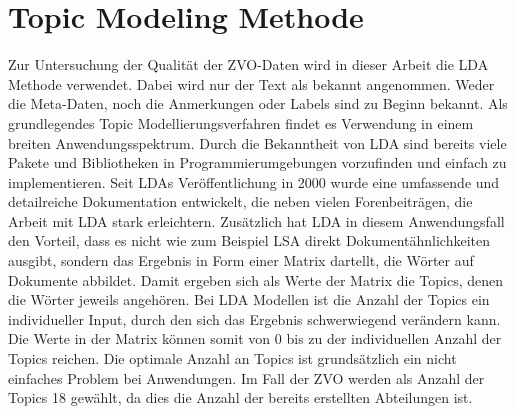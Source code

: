 \documentclass[german,version-2020-11]{uzl-thesis}
\begin{document}
\section{Topic Modeling Methode}
Zur Untersuchung der Qualität der ZVO-Daten wird in dieser Arbeit die LDA Methode verwendet. Dabei wird nur der Text als bekannt angenommen. Weder die Meta-Daten, noch die Anmerkungen oder Labels sind zu Beginn bekannt. Als grundlegendes Topic Modellierungsverfahren findet es Verwendung in einem breiten Anwendungsspektrum. Durch die Bekanntheit von LDA sind bereits viele Pakete und Bibliotheken in Programmierumgebungen vorzufinden und einfach zu implementieren. Seit LDAs Veröffentlichung in 2000 wurde eine umfassende und detailreiche Dokumentation entwickelt, die neben vielen Forenbeiträgen, die Arbeit mit LDA stark erleichtern. Zusätzlich hat LDA in diesem Anwendungsfall den Vorteil, dass es nicht wie zum Beispiel LSA direkt Dokumentähnlichkeiten ausgibt, sondern das Ergebnis in Form einer Matrix dartellt, die Wörter auf Dokumente abbildet. Damit ergeben sich als Werte der Matrix die Topics, denen die Wörter jeweils angehören. Bei LDA Modellen ist die Anzahl der Topics ein individueller Input, durch den sich das Ergebnis schwerwiegend verändern kann. Die Werte in der Matrix können somit von $0$ bis zu der individuellen Anzahl der Topics reichen. Die optimale Anzahl an Topics ist grundsätzlich ein nicht einfaches Problem bei Anwendungen. Im Fall der ZVO werden als Anzahl der Topics 18  gewählt, da dies die Anzahl der bereits erstellten Abteilungen ist. 
\end{document}
